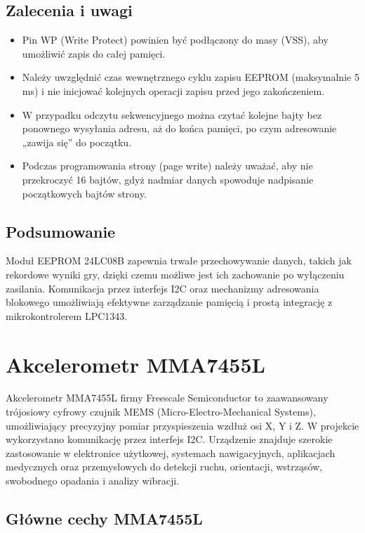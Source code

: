 \documentclass[a4paper,12pt]{report}
\begin{document}
\subsection*{Zalecenia i uwagi}

\begin{itemize}
    \item Pin WP (Write Protect) powinien być podłączony do masy (VSS), aby umożliwić zapis do całej pamięci.
    \item Należy uwzględnić czas wewnętrznego cyklu zapisu EEPROM (maksymalnie 5 ms) i nie inicjować kolejnych operacji zapisu przed jego zakończeniem.
    \item W przypadku odczytu sekwencyjnego można czytać kolejne bajty bez ponownego wysyłania adresu, aż do końca pamięci, po czym adresowanie „zawija się” do początku.
    \item Podczas programowania strony (page write) należy uważać, aby nie przekroczyć 16 bajtów, gdyż nadmiar danych spowoduje nadpisanie początkowych bajtów strony.
\end{itemize}

\subsection*{Podsumowanie}

Moduł EEPROM 24LC08B zapewnia trwałe przechowywanie danych, takich jak rekordowe wyniki gry, dzięki czemu możliwe jest ich zachowanie po wyłączeniu zasilania. Komunikacja przez interfejs I2C oraz mechanizmy adresowania blokowego umożliwiają efektywne zarządzanie pamięcią i prostą integrację z mikrokontrolerem LPC1343.

\section{Akcelerometr MMA7455L}

Akcelerometr MMA7455L firmy Freescale Semiconductor to zaawansowany trójosiowy cyfrowy czujnik MEMS (Micro-Electro-Mechanical Systems), umożliwiający precyzyjny pomiar przyspieszenia wzdłuż osi X, Y i Z. W projekcie wykorzystano komunikację przez interfejs I2C. Urządzenie znajduje szerokie zastosowanie w elektronice użytkowej, systemach nawigacyjnych, aplikacjach medycznych oraz przemysłowych do detekcji ruchu, orientacji, wstrząsów, swobodnego opadania i analizy wibracji.

\subsection{Główne cechy MMA7455L}
\end{document}
